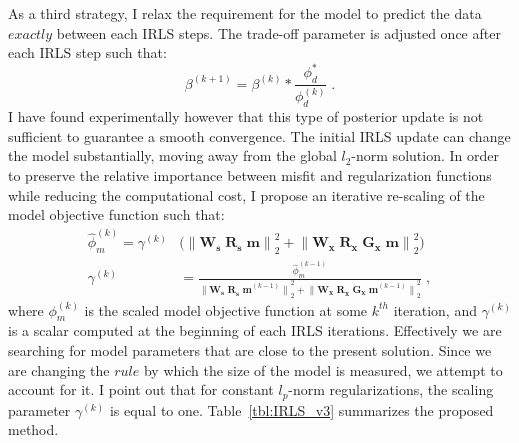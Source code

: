 As a third strategy, I relax the requirement for the model to predict the data $exactly$ between each IRLS steps. 
The trade-off parameter is adjusted once after each IRLS step such that:
\begin{equation}
\beta^{(k+1)} = \beta^{(k)} * \frac{\phi_d^*}{\phi_d^{(k)}} \;.
\end{equation}
I have found experimentally however that this type of posterior update is not sufficient to guarantee a smooth convergence. 
The initial IRLS update can change the model substantially, moving away from the global $l_2$-norm solution. 
In order to preserve the relative importance between misfit and regularization functions while reducing the computational cost, I propose an iterative re-scaling of the model objective function such that:
\begin{equation}\label{eq:scaled_Lp_phi}
\begin{split}
\hat \phi_m^{(k)} = \gamma^{(k)} & \Big ( {\| \mathbf{W_\text{s} \; R_\text{s} \; m}\|}^2_2 +  {\|  \mathbf{ W_\text{x}\; R_\text{x} \; G_\text{x} \; m}\|}^2_2  \Big ) \\
 \gamma^{(k)}  &= \frac{\hat \phi_m^{(k-1)}}{  {\| \mathbf{W_\text{s} \; R_\text{s} \; m}^{(k-1)}\|}^2_2 + {\|  \mathbf{W_\text{x}\; R_\text{x} \; G_\text{x} \; m}^{(k-1)}\|}^2_2 }\;,
 \end{split}
\end{equation}
where $\phi_m^{(k)}$ is the scaled model objective function at some $k^{th}$ iteration, and $\gamma^{(k)}$ is a scalar computed at the beginning of each IRLS iterations. 
Effectively we are searching  for model parameters that are close to the present solution.
Since we are changing the $rule$ by which the size of the model is measured, we attempt to account for it. 
I point out that for constant $l_p$-norm regularizations, the scaling parameter $\gamma^{(k)}$ is equal to one.
Table~\ref{tbl:IRLS_v3} summarizes the proposed method.

